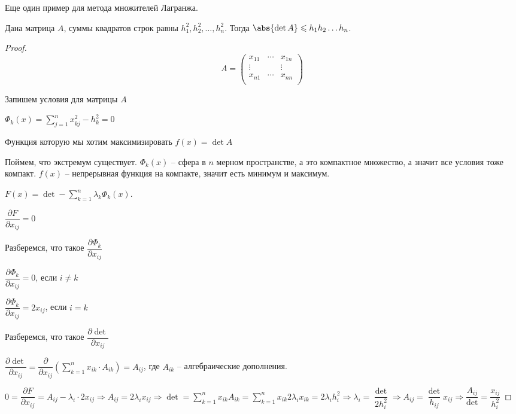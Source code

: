 
Еще один пример для метода множителей Лагранжа.

\begin{example}\slashns
    
    Дана матрица $A$, суммы квадратов строк равны $h_1^2, h_2^2, \ldots, h_n^2$. Тогда $\abs{\det A} \leqslant h_1h_2\ldots h_n$.
\end{example}

\begin{proof}\slashns
    \[
    A = \begin{pmatrix}
    x_{11} & \cdots & x_{1n} \\
    \vdots &        & \vdots \\
    x_{n1} & \cdots & x_{nn} \\
    \end{pmatrix}
    \]
    
    Запишем условия для матрицы $A$
    
    $\Phi_k(x) = \sum\limits_{j=1}^n x_{kj}^2 - h_k^2 = 0$
    
    Функция которую мы хотим максимизировать $f(x) = \det A$
    
    Поймем, что экстремум существует. $\Phi_k(x)$ -- сфера в $n$ мерном пространстве, а это компактное множество, а значит все условия тоже компакт. $f(x)$ -- непрерывная функция на компакте, значит есть минимум и максимум.
    
    $F(x) = \det - \sum\limits_{k=1}^n \lambda_k \Phi_k(x)$.
    
    $\dfrac{\partial F}{\partial x_{ij}} = 0$
    
    Разберемся, что такое $\dfrac{\partial \Phi_k}{\partial x_{ij}}$
    
    $\dfrac{\partial \Phi_k}{\partial x_{ij}} = 0$, если $i \not = k$
    
    $\dfrac{\partial \Phi_k}{\partial x_{ij}} = 2x_{ij}$, если $i = k$
    
    Разберемся, что такое $\dfrac{\partial \det}{\partial x_{ij}}$
    
    $\dfrac{\partial \det}{\partial x_{ij}} = \dfrac{\partial}{\partial x_{ij}} \left( \sum\limits_{k=1}^{n} x_{ik}\cdot A_{ik} \right) = A_{ij}$, где $A_{ik}$ -- алгебраические дополнения. 
    
    $0 = \dfrac{\partial F}{\partial x_{ij}} = A_{ij} - \lambda_i \cdot 2x_{ij} \Rightarrow A_{ij} = 2\lambda_i x_{ij} \Rightarrow \det = \sum\limits_{k=1}^n x_{ik}A_{ik} = \sum\limits_{k=1}^n x_{ik} 2\lambda_i x_{ik} = 2\lambda_i h_i^2 \Rightarrow \lambda_i = \dfrac{\det}{2h_i^2} \Rightarrow A_{ij} = \dfrac{\det}{h_{ij}} x_{ij} \Rightarrow \dfrac{A_{ij}}{\det} = \dfrac{x_{ij}}{h_i^2}$
    

\end{proof}
